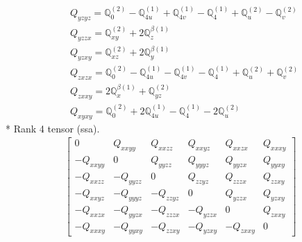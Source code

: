 \documentclass[fleqn,8pt,landscape]{jsarticle}
\begin{document}
\begin{align*}
& Q_{yzyz} = \mathbb{Q}_{0}^{(2)} - \mathbb{Q}_{4u}^{(1)} + \mathbb{Q}_{4v}^{(1)} - \mathbb{Q}_{4}^{(1)} + \mathbb{Q}_{u}^{(2)} - \mathbb{Q}_{v}^{(2)} \\
& Q_{yzzx} = \mathbb{Q}_{xy}^{(2)} + 2 \mathbb{Q}_{z}^{\beta(1)} \\
& Q_{yzxy} = \mathbb{Q}_{xz}^{(2)} + 2 \mathbb{Q}_{y}^{\beta(1)} \\
& Q_{zxzx} = \mathbb{Q}_{0}^{(2)} - \mathbb{Q}_{4u}^{(1)} - \mathbb{Q}_{4v}^{(1)} - \mathbb{Q}_{4}^{(1)} + \mathbb{Q}_{u}^{(2)} + \mathbb{Q}_{v}^{(2)} \\
& Q_{zxxy} = 2 \mathbb{Q}_{x}^{\beta(1)} + \mathbb{Q}_{yz}^{(2)} \\
& Q_{xyxy} = \mathbb{Q}_{0}^{(2)} + 2 \mathbb{Q}_{4u}^{(1)} - \mathbb{Q}_{4}^{(1)} - 2 \mathbb{Q}_{u}^{(2)}
\end{align*}
* Rank 4 tensor (ssa).
\begin{align*}
\begin{bmatrix} 0 & Q_{xxyy} & Q_{xxzz} & Q_{xxyz} & Q_{xxzx} & Q_{xxxy} \\ - Q_{xxyy} & 0 & Q_{yyzz} & Q_{yyyz} & Q_{yyzx} & Q_{yyxy} \\ - Q_{xxzz} & - Q_{yyzz} & 0 & Q_{zzyz} & Q_{zzzx} & Q_{zzxy} \\ - Q_{xxyz} & - Q_{yyyz} & - Q_{zzyz} & 0 & Q_{yzzx} & Q_{yzxy} \\ - Q_{xxzx} & - Q_{yyzx} & - Q_{zzzx} & - Q_{yzzx} & 0 & Q_{zxxy} \\ - Q_{xxxy} & - Q_{yyxy} & - Q_{zzxy} & - Q_{yzxy} & - Q_{zxxy} & 0 \end{bmatrix}
\end{align*}
\end{document}
